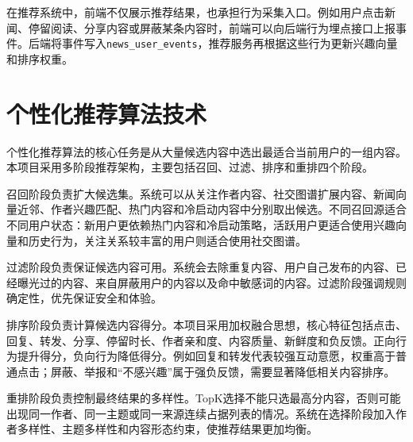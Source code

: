 在推荐系统中，前端不仅展示推荐结果，也承担行为采集入口。例如用户点击新闻、停留阅读、分享内容或屏蔽某条内容时，前端可以向后端行为埋点接口上报事件。后端将事件写入\texttt{news\_user\_events}，推荐服务再根据这些行为更新兴趣向量和排序权重。

\section{个性化推荐算法技术}

个性化推荐算法的核心任务是从大量候选内容中选出最适合当前用户的一组内容。本项目采用多阶段推荐架构，主要包括召回、过滤、排序和重排四个阶段。

召回阶段负责扩大候选集。系统可以从关注作者内容、社交图谱扩展内容、新闻向量近邻、作者兴趣匹配、热门内容和冷启动内容中分别取出候选。不同召回源适合不同用户状态：新用户更依赖热门内容和冷启动策略，活跃用户更适合使用兴趣向量和历史行为，关注关系较丰富的用户则适合使用社交图谱。

过滤阶段负责保证候选内容可用。系统会去除重复内容、用户自己发布的内容、已经曝光过的内容、来自屏蔽用户的内容以及命中敏感词的内容。过滤阶段强调规则确定性，优先保证安全和体验。

排序阶段负责计算候选内容得分。本项目采用加权融合思想，核心特征包括点击、回复、转发、分享、停留时长、作者亲和度、内容质量、新鲜度和负反馈。正向行为提升得分，负向行为降低得分。例如回复和转发代表较强互动意愿，权重高于普通点击；屏蔽、举报和“不感兴趣”属于强负反馈，需要显著降低相关内容排序。

重排阶段负责控制最终结果的多样性。TopK选择不能只选最高分内容，否则可能出现同一作者、同一主题或同一来源连续占据列表的情况。系统在选择阶段加入作者多样性、主题多样性和内容形态约束，使推荐结果更加均衡。
